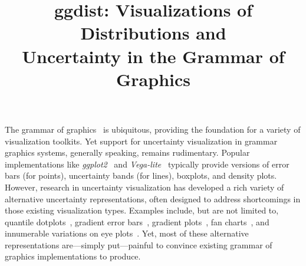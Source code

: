 \documentclass[journal]{vgtc}                     %
\title{ggdist: Visualizations of Distributions and\\Uncertainty in the Grammar of Graphics}
\author{%
  \authororcid{Matthew Kay}{0000-0001-9446-0419}
}
\begin{document}


\maketitle



The grammar of graphics~\cite{wilkinson2012grammar} is ubiquitous, providing the foundation for a variety of visualization toolkits. Yet support for uncertainty visualization in grammar graphics systems, generally speaking, remains rudimentary. Popular implementations like \textit{ggplot2}~\cite{wickham2010layered,wickham2011ggplot2} and \textit{Vega-lite}~\cite{satyanarayan2016vega} typically provide versions of error bars (for points), uncertainty bands (for lines), boxplots, and density plots. However, research in uncertainty visualization has developed a rich variety of alternative uncertainty representations, often designed to address shortcomings in those existing visualization types. Examples include, but are not limited to, quantile dotplots~\cite{kay2016ish,fernandes2018uncertainty}, gradient error bars~\cite{correll2014error}, gradient plots~\cite{bowman2019graphics,jackson2008displaying}, fan charts~\cite{jackson2008displaying}, and innumerable variations on eye plots~\cite{helske2021can,kay2016ish,barrowman2003raindrop,spiegelhalter1999surgical}. Yet, most of these alternative representations are---simply put---painful to convince existing grammar of graphics implementations to produce.
\end{document}
